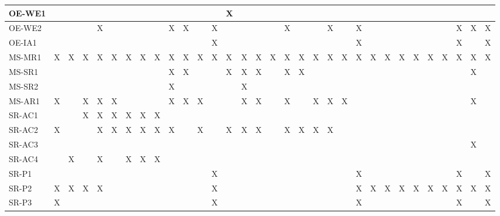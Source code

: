 \documentclass[12pt]{article}
\begin{document}
\begin{table}[H]
{\begin{tabular}{|l|l|l|l|l|l|l|l|l|l|l|l|l|l|l|l|l|l|l|l|l|l|l|l|l|l|l|l|l|l|l|l|}
      OE-WE1 & ~ & ~ & ~ & ~ & ~ & ~ & ~ & ~ & ~ & ~ & ~ & ~ & X & ~ & ~ & ~ & ~ & ~ & ~ & ~ & ~ & ~ & ~ & ~ & ~ & ~ & ~ & ~ & ~ & ~ & ~ \\ \hline
      OE-WE2 & ~ & ~ & ~ & X & ~ & ~ & ~ & ~ & X & X & ~ & X & ~ & ~ & ~ & ~ & X & ~ & ~ & X & ~ & X & ~ & ~ & ~ & ~ & ~ & ~ & X & X & X \\ \hline
      OE-IA1 & ~ & ~ & ~ & ~ & ~ & ~ & ~ & ~ & ~ & ~ & ~ & X & ~ & ~ & ~ & ~ & ~ & ~ & ~ & ~ & ~ & X & ~ & ~ & ~ & ~ & ~ & ~ & X & ~ & X \\ \hline
      MS-MR1 & X & X & X & X & X & X & X & X & X & X & X & X & X & X & X & X & X & X & X & X & X & X & X & X & X & X & X & X & X & X & X \\ \hline
      MS-SR1 & ~ & ~ & ~ & ~ & ~ & ~ & ~ & ~ & X & X & ~ & ~ & X & X & X & ~ & X & X & ~ & ~ & ~ & ~ & ~ & ~ & ~ & ~ & ~ & ~ & ~ & X & ~ \\ \hline
      MS-SR2 & ~ & ~ & ~ & ~ & ~ & ~ & ~ & ~ & X & ~ & ~ & ~ & ~ & X & ~ & ~ & ~ & ~ & ~ & ~ & ~ & ~ & ~ & ~ & ~ & ~ & ~ & ~ & ~ & ~ & ~ \\ \hline
      MS-AR1 & X & ~ & X & X & X & ~ & ~ & ~ & X & X & X & ~ & ~ & X & X & ~ & X & ~ & X & X & X & ~ & ~ & ~ & ~ & ~ & ~ & ~ & ~ & X & ~ \\ \hline
      SR-AC1 & ~ & ~ & X & X & X & X & X & X & ~ & ~ & ~ & ~ & ~ & ~ & ~ & ~ & ~ & ~ & ~ & ~ & ~ & ~ & ~ & ~ & ~ & ~ & ~ & ~ & ~ & ~ & ~ \\ \hline
      SR-AC2 & X & ~ & ~ & X & X & X & X & X & X & ~ & X & ~ & X & X & X & ~ & X & X & X & X & ~ & ~ & ~ & ~ & ~ & ~ & ~ & ~ & ~ & ~ & ~ \\ \hline
      SR-AC3 & ~ & ~ & ~ & ~ & ~ & ~ & ~ & ~ & ~ & ~ & ~ & ~ & ~ & ~ & ~ & ~ & ~ & ~ & ~ & ~ & ~ & ~ & ~ & ~ & ~ & ~ & ~ & ~ & ~ & X & ~ \\ \hline
      SR-AC4 & ~ & X & ~ & X & ~ & X & X & X & ~ & ~ & ~ & ~ & ~ & ~ & ~ & ~ & ~ & ~ & ~ & ~ & ~ & ~ & ~ & ~ & ~ & ~ & ~ & ~ & ~ & ~ & ~ \\ \hline
      SR-P1 & ~ & ~ & ~ & ~ & ~ & ~ & ~ & ~ & ~ & ~ & ~ & X & ~ & ~ & ~ & ~ & ~ & ~ & ~ & ~ & ~ & X & ~ & ~ & ~ & ~ & ~ & ~ & X & ~ & X \\ \hline
      SR-P2 & X & X & X & X & ~ & ~ & ~ & ~ & ~ & ~ & ~ & X & ~ & ~ & ~ & ~ & ~ & ~ & ~ & ~ & ~ & X & X & X & X & X & X & X & X & X & X \\ \hline
      SR-P3 & X & ~ & ~ & ~ & ~ & ~ & ~ & ~ & ~ & ~ & ~ & X & ~ & ~ & ~ & ~ & ~ & ~ & ~ & ~ & ~ & X & ~ & ~ & ~ & ~ & ~ & ~ & X & ~ & X \\ \hline

\end{tabular}}
\end{table}
\end{document}
